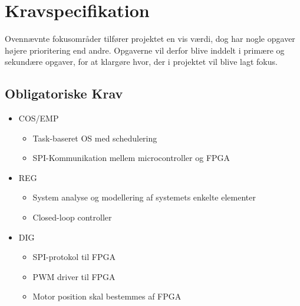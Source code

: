\section{Kravspecifikation}

Ovennævnte fokusområder tilfører projektet en vis værdi, dog har nogle opgaver højere prioritering end andre. Opgaverne vil derfor blive inddelt i primære og sekundære opgaver, for at klargøre hvor, der i projektet vil blive lagt fokus.

\subsection{Obligatoriske Krav}

\begin{itemize}[noitemsep]
	\item COS/EMP
	\begin{itemize}[noitemsep]
	\item Task-baseret OS med schedulering
	\item SPI-Kommunikation mellem microcontroller og FPGA
	\end{itemize}
	\item REG
	\begin{itemize}[noitemsep]
	\item System analyse og modellering af systemets enkelte elementer
	\item Closed-loop controller
	\end{itemize}
	\item DIG
	\begin{itemize}[noitemsep]
	\item SPI-protokol til FPGA
	\item PWM driver til FPGA
	\item Motor position skal bestemmes af FPGA
	\end{itemize}
\end{itemize}

